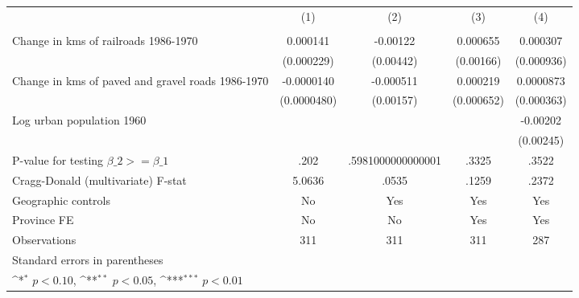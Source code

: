 {
\def\sym#1{\ifmmode^{#1}\else\(^{#1}\)\fi}
\begin{tabular}{l*{4}{c}}
\hline\hline
                &\multicolumn{1}{c}{(1)}&\multicolumn{1}{c}{(2)}&\multicolumn{1}{c}{(3)}&\multicolumn{1}{c}{(4)}\\
                &\multicolumn{1}{c}{}&\multicolumn{1}{c}{}&\multicolumn{1}{c}{}&\multicolumn{1}{c}{}\\
\hline
Change in kms of railroads 1986-1970& 0.000141         & -0.00122         & 0.000655         & 0.000307         \\
                &(0.000229)         &(0.00442)         &(0.00166)         &(0.000936)         \\
[1em]
Change in kms of paved and gravel roads 1986-1970&-0.0000140         &-0.000511         & 0.000219         &0.0000873         \\
                &(0.0000480)         &(0.00157)         &(0.000652)         &(0.000363)         \\
[1em]
Log urban population 1960&                  &                  &                  & -0.00202         \\
                &                  &                  &                  &(0.00245)         \\
\hline
P-value for testing $\beta\_{2} >= \beta\_{1}$&     .202         &.5981000000000001         &    .3325         &    .3522         \\
Cragg-Donald (multivariate) F-stat&   5.0636         &    .0535         &    .1259         &    .2372         \\
Geographic controls&       No         &      Yes         &      Yes         &      Yes         \\
Province FE     &       No         &       No         &      Yes         &      Yes         \\
Observations    &      311         &      311         &      311         &      287         \\
\hline\hline
\multicolumn{5}{l}{\footnotesize Standard errors in parentheses}\\
\multicolumn{5}{l}{\footnotesize \sym{*} \(p<0.10\), \sym{**} \(p<0.05\), \sym{***} \(p<0.01\)}\\
\end{tabular}
}
